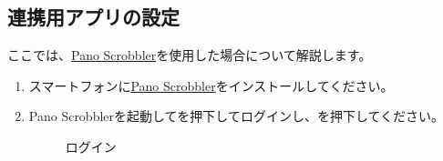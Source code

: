     \subsection{連携用アプリの設定}
        ここでは、\href{https://play.google.com/store/apps/details?id=com.arn.scrobble&hl=ja&gl=US}{Pano Scrobbler}を使用した場合について解説します。
        \begin{enumerate}
            \item スマートフォンに\href{https://play.google.com/store/apps/details?id=com.arn.scrobble&hl=ja&gl=US}{Pano Scrobbler}をインストールしてください。
            \item Pano Scrobblerを起動してを押下してログインし、を押下してください。
                \begin{figure}[htbp]
                    \begin{minipage}[b]{0.45\linewidth}
                        \centering
                        \label{img:lastfm5}
                    \end{minipage}
                    \begin{minipage}[b]{0.45\linewidth}
                        \centering
                        \label{img:lastfm6}
                    \end{minipage}
                    \caption*{ログイン}
                \end{figure}


\end{enumerate}
